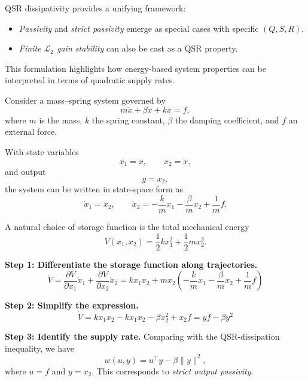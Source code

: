 \begin{remark}
QSR dissipativity provides a unifying framework:  
\begin{itemize}
    \item \emph{Passivity} and \emph{strict passivity} emerge as special cases with 
    specific $(Q,S,R)$.  
    \item \emph{Finite $\mathcal{L}_2$ gain stability} can also be cast as a QSR property.  
\end{itemize}
This formulation highlights how energy-based system properties can be interpreted 
in terms of quadratic supply rates.
\end{remark}

\begin{example}
Consider a mass--spring system governed by
\begin{equation}
m \ddot{x} + \beta \dot{x} + kx = f,
\end{equation}
where $m$ is the mass, $k$ the spring constant, $\beta$ the damping coefficient, and $f$ 
an external force.  

With state variables 
\begin{equation}
x_1 = x, \qquad x_2 = \dot{x},
\end{equation}
and output 
\begin{equation}
y = x_2,
\end{equation}
the system can be written in state-space form as
\begin{equation}
\dot{x}_1 = x_2, 
\qquad \dot{x}_2 = -\frac{k}{m} x_1 - \frac{\beta}{m} x_2 + \frac{1}{m} f.
\end{equation}

A natural choice of storage function is the total mechanical energy
\begin{equation}
V(x_1,x_2) = \frac{1}{2} k x_1^2 + \frac{1}{2} m x_2^2.
\end{equation}

\textbf{Step 1: Differentiate the storage function along trajectories.}  
\begin{equation}
\dot{V} = \frac{\partial V}{\partial x_1} \dot{x}_1 + \frac{\partial V}{\partial x_2} \dot{x}_2
= k x_1 x_2 + m x_2 \left(-\frac{k}{m} x_1 - \frac{\beta}{m} x_2 + \frac{1}{m} f \right)
\end{equation}

\textbf{Step 2: Simplify the expression.}  
\begin{equation}
\dot{V} = k x_1 x_2 - k x_1 x_2 - \beta x_2^2 + x_2 f = y f - \beta y^2
\end{equation}

\textbf{Step 3: Identify the supply rate.}  
Comparing with the QSR-dissipation inequality, we have
\begin{equation}
w(u,y) = u^\top y - \beta \|y\|^2,
\end{equation}
where \(u = f\) and \(y = x_2\). This corresponds to \emph{strict output passivity}.

\end{example}

